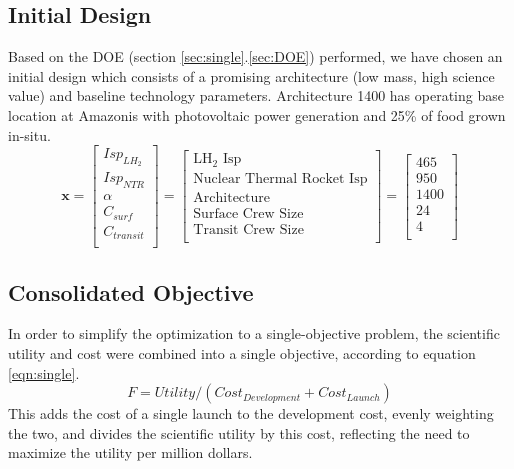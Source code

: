 \documentclass[]{aiaa-pretty}
\begin{document}
\subsection{Initial Design}
Based on the DOE (section \ref{sec:single}.\ref{sec:DOE}) performed, we have chosen an initial design which consists of a promising architecture (low mass, high science value) and baseline technology parameters. Architecture 1400 has operating base location at Amazonis with photovoltaic power generation and 25\% of food grown in-situ.
\begin{equation*}
\mathbf{x}=
\begin{bmatrix}
Isp_{LH_2}\\
Isp_{NTR}\\
\alpha\\
C_{surf}\\
C_{transit}\\
\end{bmatrix}
=
\begin{bmatrix}
\mbox{LH}_2\mbox{ Isp}\\
\mbox{Nuclear Thermal Rocket Isp}\\
\mbox{Architecture}\\
\mbox{Surface Crew Size}\\
\mbox{Transit Crew Size}\\
\end{bmatrix}
=
\begin{bmatrix}
465\\
950\\
1400\\
24\\
4\\
\end{bmatrix}
\end{equation*}

\subsection{Consolidated Objective}
In order to simplify the optimization to a single-objective problem, the scientific utility and cost were combined into a single objective, according to equation \ref{eqn:single}.
\begin{equation}
F = Utility/(Cost_{Development}+Cost_{Launch})
\label{eqn:single}
\end{equation}
This adds the cost of a single launch to the development cost, evenly weighting the two, and divides the scientific utility by this cost, reflecting the need to maximize the utility per million dollars.
\end{document}
